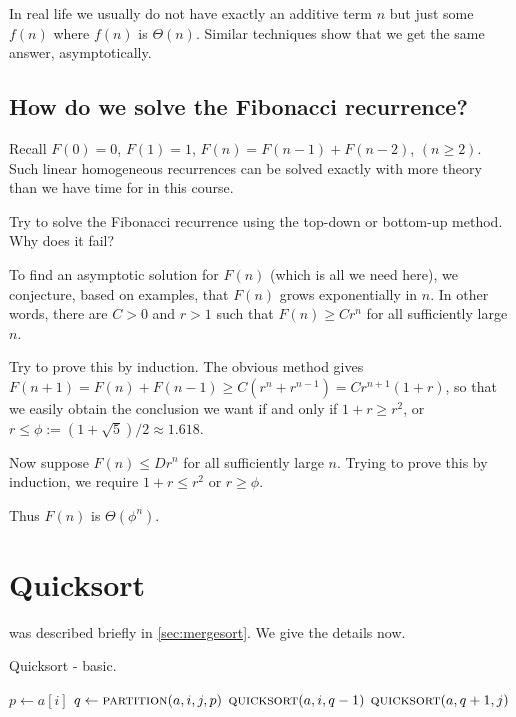 In real life we usually do not have exactly an additive term $n$
but just some $f(n)$ where $f(n)$ is $\Theta(n)$. Similar techniques show that 
we get the same answer, asymptotically. 


\section{How do we solve the Fibonacci recurrence?}
Recall $F(0) = 0$, $F(1) = 1$, $F(n) = F(n-1) + F(n-2)$,  $(n \geq 2)$.
Such linear homogeneous recurrences can be solved exactly with
more theory than we have time for in this course. 

\begin{Boxample}[3]
Try to solve the Fibonacci recurrence using the top-down or bottom-up method. Why does it fail?

\end{Boxample}

To find an asymptotic solution for $F(n)$ (which is all we need here), we conjecture, based on examples, 
that $F(n)$ grows exponentially in $n$. 
In other words, there are $C > 0$ and $r > 1$ such that 
$F(n) \geq C r^n$ for all sufficiently large $n$.

Try to prove this by induction. The obvious method gives 
$F(n+1) = F(n) + F(n-1) \geq C(r^n + r^{n-1}) = Cr^{n+1}(1+r)$, so that we easily obtain
the conclusion we want if and only if $1 + r \geq r^2$, or $r \leq
\phi:= (1 + \sqrt{5})/2 \approx 1.618$. 

Now suppose $F(n) \leq D r^n$ for all sufficiently large $n$. 
Trying to prove this by induction, we require $1 + r \leq r^2$ or $r \geq \phi$. 

Thus $F(n)$ is $\Theta(\phi^n)$.


\chapter{Quicksort} %
\label{sec:quicksort}

 was described briefly in \cref{sec:mergesort}. We give the details now.

\begin{algorithm}[H]
  \caption{Quicksort - basic.}    
  \label{alg:quicksort}
\begin{algorithmic}[0]
			\State $p \gets a[i]$ 
			\State $q \gets  \Call{partition}{a, i,j,p}$ 
			\State $\Call{quicksort}{a,i,q-1}$ 
			\State $\Call{quicksort}{a,q+1,j}$ 
		\EndIf
	\EndFunction  
\end{algorithmic}
\end{algorithm}

